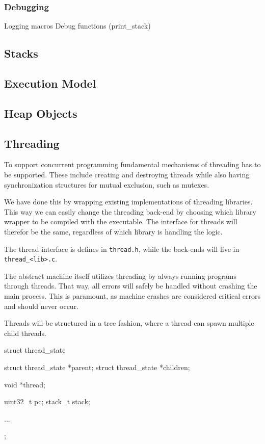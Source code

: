 \subsubsection{Debugging}
Logging macros
Debug functions (print\_stack)


\subsection{Stacks}
\label{sec:implementation:stacks}


\subsection{Execution Model}
% 

\subsection{Heap Objects}


\subsection{Threading}

To support concurrent programming fundamental mechanisms of threading has to be
supported. These include creating and destroying threads while also having
synchronization structures for mutual exclusion, such as mutexes.

We have done this by wrapping existing implementations of threading libraries.
This way we can easily change the threading back-end by choosing which library
wrapper to be compiled with the executable. The interface for threads will
therefor be the same, regardless of which library is handling the logic.

The thread interface is defines in {\tt thread.h}, while the back-ends will live
in {\tt thread\_<lib>.c}.

The abstract machine itself utilizes threading by always running programs
through threads. That way, all errors will safely be handled without crashing
the main process. This is paramount, as machine crashes are considered critical
errors and should never occur.

Threads will be structured in a tree fashion, where a thread can spawn multiple
child threads.
\begin{ccode}
struct thread_state {
    struct thread_state *parent;
    struct thread_state *children;

    void *thread;

    uint32_t pc;
    stack_t stack;

    ...
};
\end{ccode}

